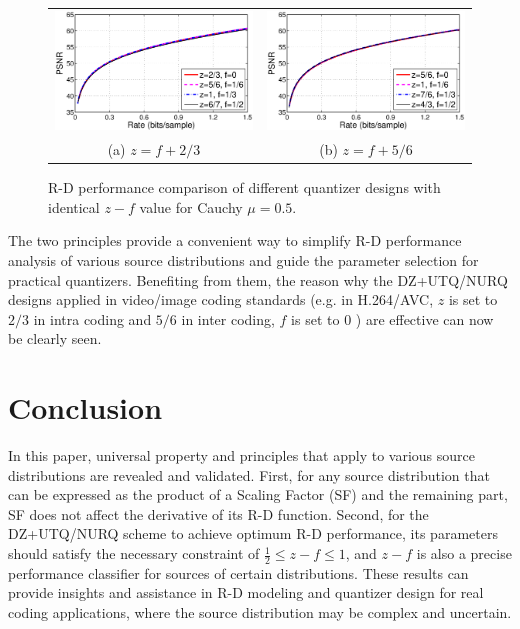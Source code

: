 \documentclass[smallabstract,smallcaptions]{dccpaper}
\begin{document}
\begin{figure}
\begin{center}
\begin{tabular}{cc}
\includegraphics[width = 0.45\linewidth]{Figures/section4/RD_Cauchy_mu=0_5_z=p+0_67} &
\includegraphics[width = 0.45\linewidth]{Figures/section4/RD_Cauchy_mu=0_5_z=p+0_83} \\
{\small (a) $z=f+2/3$} & {\small (b) $z=f+5/6$}
\end{tabular}
\end{center}
\vspace{-20pt}
\caption{\label{fig:RD_same_pattern}
R-D performance comparison of different quantizer designs with identical $z-f$ value for Cauchy $\mu=0.5$.}
\end{figure}

The two principles provide a convenient way to simplify R-D performance analysis of various source distributions and guide the parameter selection for practical quantizers. Benefiting from them, the reason why the DZ+UTQ/NURQ designs applied in video/image coding standards (e.g. in H.264/AVC, $z$ is set to $2/3$ in intra coding and $5/6$ in inter coding, $f$ is set to $0$ \cite{Sullivan_VCIP2005}) are effective can now be clearly seen.

\section{Conclusion}
\label{sec:conclusion}

In this paper, universal property and principles that apply to various source distributions are revealed and validated. First, for any source distribution that can be expressed as the product of a Scaling Factor (SF) and the remaining part, SF does not affect the derivative of its R-D function. Second, for the DZ+UTQ/NURQ scheme to achieve optimum R-D performance, its parameters should satisfy the necessary constraint of $\frac{1}{2} \le z - f \le 1$, and $z - f$ is also a precise performance classifier for sources of certain distributions. These results can provide insights and assistance in R-D modeling and quantizer design for real coding applications, where the source distribution may be complex and uncertain.
\end{document}
